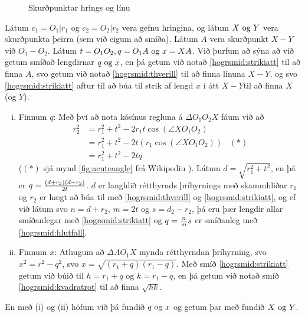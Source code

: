 \begin{frame}
  \begin{figure}[H]
    \centering

    \caption{Skurðpunktar hrings og línu}
    \label{fig:hogrskphringsoglinu}
  \end{figure}
\end{frame}

\begin{frame}[allowframebreaks]
  \begin{hogrsmid}\label{hogrsmid:skphringja}
    Látum \(c_1 = O_1|r_1\) og \(c_2 = O_2|r_2\) vera gefnu hringina, og látum
    \(X \text{ og } Y\) vera skurðpunkta þeirra (sem við eigum að smíða).
    Látum \(A\) vera skurðpunkt \(X-Y\) við \(O_1-O_2\).
    Látum \(t = O_1O_2, q = O_1A \text{ og } x = XA\).
    Við þurfum að sýna að við getum smíðað lengdirnar \(q \text{ og } x\),
    en þá getum við notað \ref{hogrsmid:strikiatt} til að finna \(A\),
    svo getum við notað \ref{hogrsmid:thverill} til að finna línuna \(X-Y\),
    og svo \ref{hogrsmid:strikiatt} aftur til að
    búa til strik af lengd \(x\) í átt \(X-Y\)til að finna \(X\) (og \(Y\)).
  \end{hogrsmid}
  
    \begin{enumerate}[(i)]
      \item Finnum \(q\):
        Með því að nota kósínus regluna \cite{WikiCos} á
        \(\Delta O_1O_2X\) fáum við að
        \begin{align*}
          r_2^2 & = r_1^2 + t^2 - 2r_1 t \cos{(\angle XO_1O_2)}\\
                & = r_1^2 + t^2 - 2t(r_1  \cos{(\angle XO_1O_2)}) \;\;\;(*)\\
                & = r_1^2 + t^2 - 2tq
        \end{align*}
        (\((*)\)
        sjá mynd \ref{fig:acuteangle} frá Wikipediu \cite{WikiCos}).
        Látum \(d = \sqrt{r_1^2 + t^2}\),
        en þá er \(q = \frac{(d+r_2)(d-r_2)}{2t}\).
        \(d\)
        er langhlið rétthyrnds þríhyrnings með skammhliðar \(r_1\)
        og \(r_2\)
        er hægt að búa til með \ref{hogrsmid:thverill} og
        \ref{hogrsmid:strikiatt}, og ef við látum svo \(n = d+r_2\),
        \(m = 2t\)
        og \(s = d_2 -r_2\),
        þá eru þær lengdir allar smíðanlegar með
        \ref{hogrsmid:strikiatt} og \(q = \frac{n}{m}s\)
        er smíðanleg með \ref{hogrsmid:hlutfall}.
      \item Finnum \(x\):
        Athugum að \(\Delta AO_1X\)
        mynda rétthyrndan þríhyrning, svo \(x^2 = r^2 - q^2\),
        svo \(x = \sqrt{(r_1+q)(r_1-q)}\).
        Með smíð \ref{hogrsmid:strikiatt} getum við búið til
        \(h = r_1 +q\)
        og \(k = r_1 - q\),
        en þá getum við notað smíð \ref{hogrsmid:kvadratrot} til að
        finna \(\sqrt{hk}\).

    \end{enumerate}
    En með (i) og (ii) höfum við þá fundið \(q \text{ og } x\) og getum þar með
    fundið \(X \text{ og } Y\).
\end{frame}


